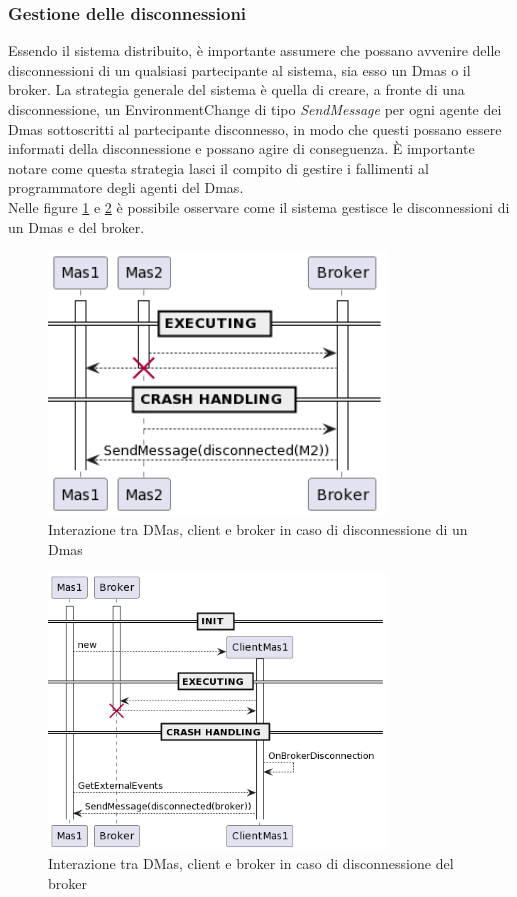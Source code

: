 \subsubsection{Gestione delle disconnessioni}
Essendo il sistema distribuito, è importante assumere che possano avvenire delle disconnessioni di un qualsiasi partecipante al sistema, sia esso un Dmas o il broker.
La strategia generale del sistema è quella di creare, a fronte di una disconnessione, un EnvironmentChange di tipo \textit{SendMessage} per ogni agente dei Dmas sottoscritti al
partecipante disconnesso, in modo che questi possano essere informati della disconnessione e possano agire di conseguenza. È importante notare come questa strategia lasci il compito
di gestire i fallimenti al programmatore degli agenti del Dmas. \\

Nelle figure \ref{fig:interaction-disconnect} e \ref{fig:interaction-disconnect-broker} è possibile osservare come il sistema gestisce le disconnessioni di un Dmas e del broker.

\begin{figure}[ht!]
    \centering
    \includegraphics[width=0.8\textwidth]{figures/sequence-client-crash.png}
    \caption{Interazione tra DMas, client e broker in caso di disconnessione di un Dmas}
    \label{fig:interaction-disconnect}
\end{figure}

\begin{figure}[ht!]
    \centering
    \includegraphics[width=0.8\textwidth]{figures/sequence-broker-crash.png}
    \caption{Interazione tra DMas, client e broker in caso di disconnessione del broker}
    \label{fig:interaction-disconnect-broker}
\end{figure}